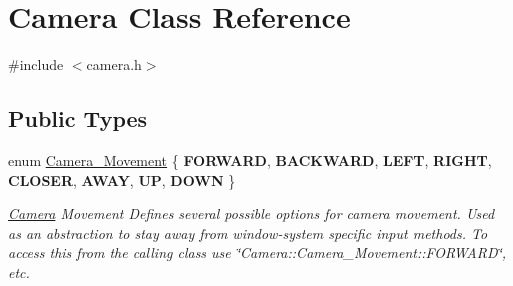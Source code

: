 \hypertarget{classCamera}{}\section{Camera Class Reference}
\label{classCamera}


{\ttfamily \#include $<$camera.\+h$>$}

\subsection*{Public Types}
\begin{DoxyCompactItemize}
\item 
\mbox{\label{classCamera_a910e91793a0078a11eef1cba77dec353}} 
enum \hyperlink{classCamera_a910e91793a0078a11eef1cba77dec353}{Camera\+\_\+\+Movement} \{ \newline
{\bfseries F\+O\+R\+W\+A\+RD}, 
{\bfseries B\+A\+C\+K\+W\+A\+RD}, 
{\bfseries L\+E\+FT}, 
{\bfseries R\+I\+G\+HT}, 
\newline
{\bfseries C\+L\+O\+S\+ER}, 
{\bfseries A\+W\+AY}, 
{\bfseries UP}, 
{\bfseries D\+O\+WN}
 \}\begin{DoxyCompactList}\small\item\em \hyperlink{classCamera}{Camera} Movement Defines several possible options for camera movement. Used as an abstraction to stay away from window-\/system specific input methods. To access this from the calling class use \char`\"{}\+Camera\+::\+Camera\+\_\+\+Movement\+::\+F\+O\+R\+W\+A\+R\+D\char`\"{}, etc. \end{DoxyCompactList}
\end{DoxyCompactItemize}
